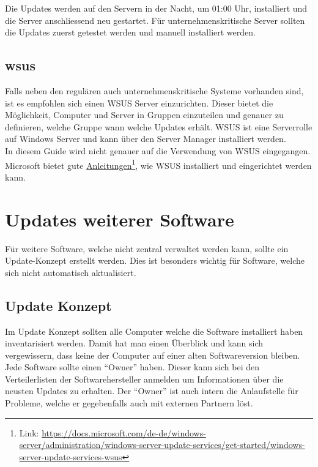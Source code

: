 Die Updates werden auf den Servern in der Nacht, um 01:00 Uhr, installiert und die Server anschliessend neu gestartet.
Für unternehmenskritische Server sollten die Updates zuerst getestet werden und manuell installiert werden.

\subsection{\acrfull{wsus}}\label{subsec:wsus}
Falls neben den regulären auch unternehmenskritische Systeme vorhanden sind, ist es empfohlen sich einen WSUS Server einzurichten.
Dieser bietet die Möglichkeit, Computer und Server in Gruppen einzuteilen und genauer zu definieren, welche Gruppe wann welche Updates erhält.
WSUS ist eine Serverrolle auf Windows Server und kann über den Server Manager installiert werden.\\

In diesem Guide wird nicht genauer auf die Verwendung von WSUS eingegangen.
Microsoft bietet gute \href{https://docs.microsoft.com/de-de/windows-server/administration/windows-server-update-services/get-started/windows-server-update-services-wsus}{Anleitungen}\footnote{Link: \href{https://docs.microsoft.com/de-de/windows-server/administration/windows-server-update-services/get-started/windows-server-update-services-wsus}{https://docs.microsoft.com/de-de/windows-server/administration/windows-server-update-services/get-started/windows-server-update-services-wsus}}, wie WSUS installiert und eingerichtet werden kann.


\section{Updates weiterer Software}
Für weitere Software, welche nicht zentral verwaltet werden kann, sollte ein Update-Konzept erstellt werden.
Dies ist besonders wichtig für Software, welche sich nicht automatisch aktualisiert. 

\subsection{Update Konzept}
Im Update Konzept sollten alle Computer welche die Software installiert haben inventarisiert werden.
Damit hat man einen Überblick und kann sich vergewissern, dass keine der Computer auf einer alten Softwareversion bleiben.
Jede Software sollte einen ``Owner'' haben. 
Dieser kann sich bei den Verteilerlisten der Softwarehersteller anmelden um Informationen über die neusten Updates zu erhalten.
Der ``Owner'' ist auch intern die Anlaufstelle für Probleme, welche er gegebenfalls auch mit externen Partnern löst.
